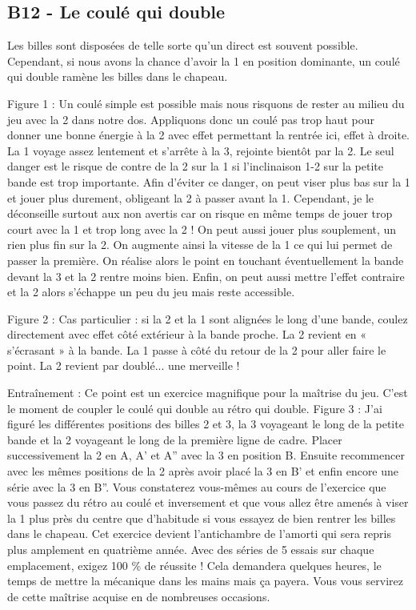 \subsection{B12 - Le coulé qui
double}\label{b12---le-couluxe9-qui-double}

Les billes sont disposées de telle sorte qu'un direct est souvent
possible. Cependant, si nous avons la chance d'avoir la 1 en position
dominante, un coulé qui double ramène les billes dans le chapeau.

Figure 1 : Un coulé simple est possible mais nous risquons de rester au
milieu du jeu avec la 2 dans notre dos. Appliquons donc un coulé pas
trop haut pour donner une bonne énergie à la 2 avec effet permettant la
rentrée ici, effet à droite. La 1 voyage assez lentement et s'arrête à
la 3, rejointe bientôt par la 2. Le seul danger est le risque de contre
de la 2 sur la 1 si l'inclinaison 1-2 sur la petite bande est trop
importante. Afin d'éviter ce danger, on peut viser plus bas sur la 1 et
jouer plus durement, obligeant la 2 à passer avant la 1. Cependant, je
le déconseille surtout aux non avertis car on risque en même temps de
jouer trop court avec la 1 et trop long avec la 2 ! On peut aussi jouer
plus souplement, un rien plus fin sur la 2. On augmente ainsi la vitesse
de la 1 ce qui lui permet de passer la première. On réalise alors le
point en touchant éventuellement la bande devant la 3 et la 2 rentre
moins bien. Enfin, on peut aussi mettre l'effet contraire et la 2 alors
s'échappe un peu du jeu mais reste accessible.

Figure 2 : Cas particulier : si la 2 et la 1 sont alignées le long d'une
bande, coulez directement avec effet côté extérieur à la bande proche.
La 2 revient en « s'écrasant » à la bande. La 1 passe à côté du retour
de la 2 pour aller faire le point. La 2 revient par doublé... une
merveille !

Entraînement : Ce point est un exercice magnifique pour la maîtrise du
jeu. C'est le moment de coupler le coulé qui double au rétro qui double.
Figure 3 : J'ai figuré les différentes positions des billes 2 et 3, la 3
voyageant le long de la petite bande et la 2 voyageant le long de la
première ligne de cadre. Placer successivement la 2 en A, A' et A'' avec
la 3 en position B. Ensuite recommencer avec les mêmes positions de la 2
après avoir placé la 3 en B' et enfin encore une série avec la 3 en B''.
Vous constaterez vous-mêmes au cours de l'exercice que vous passez du
rétro au coulé et inversement et que vous allez être amenés à viser la 1
plus près du centre que d'habitude si vous essayez de bien rentrer les
billes dans le chapeau. Cet exercice devient l'antichambre de l'amorti
qui sera repris plus amplement en quatrième année. Avec des séries de 5
essais sur chaque emplacement, exigez 100 \% de réussite ! Cela
demandera quelques heures, le temps de mettre la mécanique dans les
mains mais ça payera. Vous vous servirez de cette maîtrise acquise en de
nombreuses occasions.

